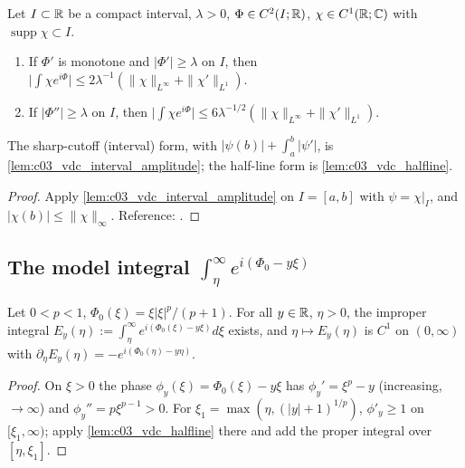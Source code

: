 \begin{lemma}
  \label{lem:van_der_Corput}
  Let $I\subset\mathbb{R}$ be a compact interval, $\lambda>0$, $\Phi\in C^2(I;\mathbb{R})$, $\chi\in C^1(\mathbb{R};\mathbb{C})$ with $\operatorname{supp}\chi\subset I$.
  \begin{enumerate}
    \item If $\Phi'$ is monotone and $|\Phi'|\ge\lambda$ on $I$, then $\bigl|\int\chi e^{i\Phi}\bigr|\le2\lambda^{-1}(\|\chi\|_{L^\infty}+\|\chi'\|_{L^1})$.
    \item If $|\Phi''|\ge\lambda$ on $I$, then $\bigl|\int\chi e^{i\Phi}\bigr|\le6\lambda^{-1/2}(\|\chi\|_{L^\infty}+\|\chi'\|_{L^1})$.
  \end{enumerate}
  The sharp-cutoff (interval) form, with $|\psi(b)|+\int_a^b|\psi'|$, is \cref{lem:c03_vdc_interval_amplitude}; the half-line form is \cref{lem:c03_vdc_halfline}.
\end{lemma}
\begin{proof}
  Apply \cref{lem:c03_vdc_interval_amplitude} on $I=[a,b]$ with $\psi=\chi|_I$, and $|\chi(b)|\le\|\chi\|_\infty$. Reference: \cite[Ch.~VIII, Prop.~2 and Cor.]{Stein:harmonic-analysis}.
\end{proof}

\subsection{The model integral $\int_\eta^\infty e^{i(\Phi_0-y\xi)}$}

\begin{lemma}
  \label{lem:c03_stationary_existence}
  Let $0<p<1$, $\Phi_0(\xi)=\xi|\xi|^p/(p+1)$. For all $y\in\mathbb{R}$, $\eta>0$, the improper integral
  $E_y(\eta):=\int_\eta^\infty e^{i(\Phi_0(\xi)-y\xi)}d\xi$ exists, and $\eta\mapsto E_y(\eta)$ is $C^1$ on $(0,\infty)$ with $\partial_\eta E_y(\eta)=-e^{i(\Phi_0(\eta)-y\eta)}$.
\end{lemma}
\begin{proof}
  On $\xi>0$ the phase $\phi_y(\xi)=\Phi_0(\xi)-y\xi$ has $\phi_y'=\xi^p-y$ (increasing, $\to\infty$) and $\phi_y''=p\xi^{p-1}>0$. For $\xi_1=\max(\eta,(|y|+1)^{1/p})$, $\phi'_y\ge1$ on $[\xi_1,\infty)$; apply \cref{lem:c03_vdc_halfline} there and add the proper integral over $[\eta,\xi_1]$.
\end{proof}

